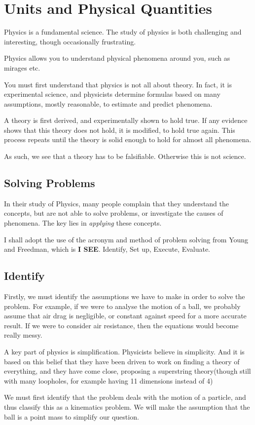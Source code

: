 \section{Units and Physical Quantities}
Physics is a fundamental science. The study of physics is both challenging and interesting, though occasionally frustrating.

Physics allows you to understand physical phenomena around you, such as mirages etc.

You must first understand that physics is not all about theory. In fact, it is experimental science, and physicists determine formulas based on many assumptions, mostly reasonable, to estimate and predict phenomena.

A theory is first derived, and experimentally shown to hold true. If any evidence shows that this theory does not hold, it is modified, to hold true again. This process repeats until the theory is solid enough to hold for almost all phenomena.

As such, we see that a theory has to be falsifiable. Otherwise this is not science.

\subsection{Solving Problems}
In their study of Physics, many people complain that they understand the concepts, but are not able to solve problems, or investigate the causes of phenomena. The key lies in \textit{applying} these concepts.

I shall adopt the use of the acronym and method of problem solving from Young and Freedman, which is \textbf{I SEE}. Identify, Set up, Execute, Evaluate.

\subsection{Identify}
Firstly, we must identify the assumptions we have to make in order to solve the problem. For example, if we were to analyse the motion of a ball, we probably assume that air drag is negligible, or constant against speed for a more accurate result. If we were to consider air resistance, then the equations would become really messy.

A key part of physics is simplification. Physicists believe in simplicity. And it is based on this belief that they have been driven to work on finding a theory of everything, and they have come close, proposing a superstring theory(though still with many loopholes, for example having 11 dimensions instead of 4)

We must first identify that the problem deals with the motion of a particle, and thus classify this as a kinematics problem. We will make the assumption that the ball is a point mass to simplify our question.